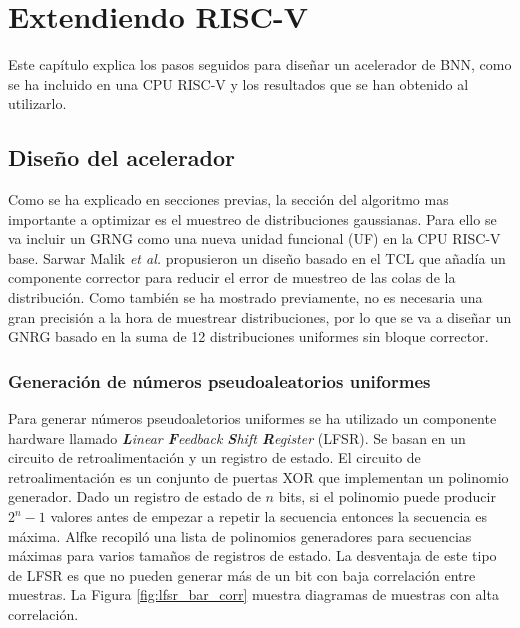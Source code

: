 \chapter{Extendiendo RISC-V}

Este capítulo explica los pasos seguidos para diseñar un acelerador de BNN, como se ha incluido en una CPU RISC-V y los resultados que se han obtenido al utilizarlo.

\section{Diseño del acelerador}

Como se ha explicado en secciones previas, la sección del algoritmo mas importante a optimizar es el muestreo de distribuciones gaussianas. Para ello se va incluir un GRNG como una nueva unidad funcional (UF) en la CPU RISC-V base. Sarwar Malik \emph{et al.} \cite{clt_grng} propusieron un diseño basado en el TCL que añadía un componente corrector para reducir el error de muestreo de las colas de la distribución. Como también se ha mostrado previamente, no es necesaria una gran precisión a la hora de muestrear distribuciones, por lo que se va a diseñar un GNRG basado en la suma de 12 distribuciones uniformes sin bloque corrector.

\subsection{Generación de números pseudoaleatorios uniformes}

Para generar números pseudoaletorios uniformes se ha utilizado un componente hardware llamado \textit{\textbf{L}inear \textbf{F}eedback \textbf{S}hift \textbf{R}egister} (LFSR). Se basan en un circuito de retroalimentación y un registro de estado. El circuito de retroalimentación es un conjunto de puertas XOR que implementan un polinomio generador. Dado un registro de estado de $n$ bits, si el polinomio puede producir $2^n-1$ valores antes de empezar a repetir la secuencia entonces la secuencia es máxima. Alfke \cite{lfsr_poly} recopiló una lista de polinomios generadores para secuencias máximas para varios tamaños de registros de estado. La desventaja de este tipo de LFSR es que no pueden generar más de un bit con baja correlación entre muestras. La Figura \ref{fig:lfsr_bar_corr} muestra diagramas de muestras con alta correlación.

